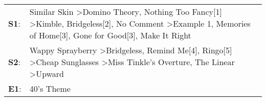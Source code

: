 \begin{supertabular}{p{0.03\textwidth}p{0.92\textwidth}}
 \textbf{S1}:  &  Similar Skin\textsuperscript{} \textgreater \enspace Domino Theory\textsuperscript{}, \enspace Nothing Too Fancy[1]\textsuperscript{} \textgreater \enspace Kimble\textsuperscript{}, \enspace Bridgeless[2]\textsuperscript{}, \enspace No Comment\textsuperscript{} \textgreater \enspace Example 1\textsuperscript{}, \enspace Memories of Home[3]\textsuperscript{}, \enspace Gone for Good[3]\textsuperscript{}, \enspace Make It Right\textsuperscript{}  \enspace  \\
 \textbf{S2}:  &                                                                               Wappy Sprayberry\textsuperscript{} \textgreater \enspace Bridgeless\textsuperscript{}, \enspace Remind Me[4]\textsuperscript{}, \enspace Ringo[5]\textsuperscript{} \textgreater \enspace Cheap Sunglasses\textsuperscript{} \textgreater \enspace Miss Tinkle's Overture\textsuperscript{}, \enspace The Linear\textsuperscript{} \textgreater \enspace Upward\textsuperscript{}  \enspace  \\
 \textbf{E1}:  &                                                                                                                                                                                                                                                                                                                                                                                                                                    40's Theme\textsuperscript{}  \enspace  \\
\end{supertabular}

